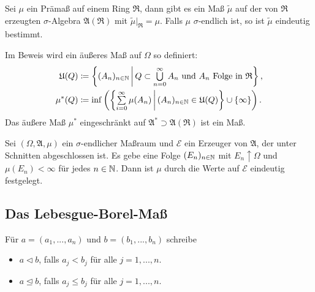 \documentclass{cheat-sheet}
\newcommand{\Alg}{\mathfrak{A}} %
\newcommand{\Ring}{\mathfrak{R}} %
\theoremstyle{definition}
\begin{document}
\begin{satz}
  Sei $\mu$ ein Prämaß auf einem Ring $\Ring$, dann gibt es ein Maß $\tilde{\mu}$ auf der von $\Ring$ erzeugten $\sigma$-Algebra $\Alg(\Ring)$ mit $\tilde{\mu}|_\Ring = \mu$. Falls $\mu$ $\sigma$-endlich ist, so ist $\tilde{\mu}$ eindeutig bestimmt.
\end{satz}

\begin{bem}
  Im Beweis wird ein äußeres Maß auf $\Omega$ so definiert:
  \begin{align*}
    \mathfrak{U}(Q) &\coloneqq \left\{ (A_n)_{n \in \N} \,\middle|\, Q \subset \bigcup_{n = 0}^\infty A_n \text{ und } A_n \text{ Folge in } \Ring \right\}, \\
    \mu^*(Q) &\coloneqq \inf \left( \left\{ \sum_{i = 0}^\infty \mu(A_n) \,\middle|\, (A_n)_{n \in \N} \in \mathfrak{U}(Q) \right\} \cup \{ \infty \} \right).
  \end{align*}
  Das äußere Maß $\mu^*$ eingeschränkt auf $\Alg^* \supset \Alg(\Ring)$ ist ein Maß.
\end{bem}

\begin{satz}
  Sei $(\Omega, \Alg, \mu)$ ein $\sigma$-endlicher Maßraum und $\mathcal{E}$ ein Erzeuger von $\Alg$, der unter Schnitten abgeschlossen ist. Es gebe eine Folge $(E_n)_{n \in \mathbb{N}}$ mit $E_n \uparrow \Omega$ und $\mu(E_n) < \infty$ für jedes $n \in \mathbb{N}$. Dann ist $\mu$ durch die Werte auf $\mathcal{E}$ eindeutig festgelegt.
\end{satz}

\begin{samepage}


\subsection{Das Lebesgue-Borel-Maß}

\begin{nota}
  Für $a = (a_1, ..., a_n)$ und $b = (b_1, ..., b_n)$ schreibe
  \begin{itemize}
    \item $a \lhd b$, falls $a_j < b_j$ für alle $j = 1, ..., n$.
    \item $a \unlhd b$, falls $a_j \leq b_j$ für alle $j = 1, ..., n$.
  \end{itemize}
\end{nota}

\end{samepage}
\end{document}
